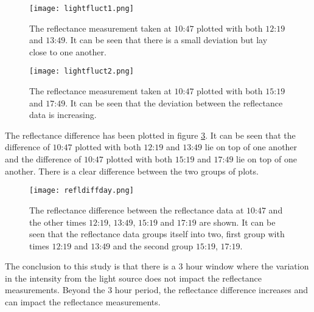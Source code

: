 \documentclass[MasterThesisMain.tex]{subfiles}
\begin{document}
\begin{figure}
\centering
\texttt{[image: lightfluct1.png]}
\caption{The reflectance measurement taken at $10$:$47$ plotted with both $12$:$19$ and $13$:$49$. It can be seen that there is a small deviation but lay close to one another.}
\label{fig:day1}
\end{figure}

\begin{figure}
\centering
\texttt{[image: lightfluct2.png]}
\caption{The reflectance measurement taken at $10$:$47$ plotted with both $15$:$19$ and $17$:$49$. It can be seen that the deviation between the reflectance data is increasing.}
\label{fig:day2}
\end{figure}

The reflectance difference has been plotted in figure \ref{fig:day3}. It can be seen that the difference of $10$:$47$ plotted with both $12$:$19$ and $13$:$49$ lie on top of one another and the difference of $10$:$47$ plotted with both $15$:$19$ and $17$:$49$ lie on top of one another. There is a clear difference between the two groups of plots.

\begin{figure}
\centering
\texttt{[image: refldiffday.png]}
\caption{The reflectance difference between the reflectance data at $10$:$47$ and the other times $12$:$19$, $13$:$49$, $15$:$19$ and $17$:$19$ are shown. It can be seen that the reflectance data groups itself into two, first group with times $12$:$19$ and $13$:$49$ and the second group $15$:$19$, $17$:$19$.}
\label{fig:day3}
\end{figure}
\pagebreak
The conclusion to this study is that there is a $3$ hour window where the variation in the intensity from the light source does not impact the reflectance measurements. Beyond the $3$ hour period, the reflectance difference increases and can impact the reflectance measurements.

	
\end{document}
